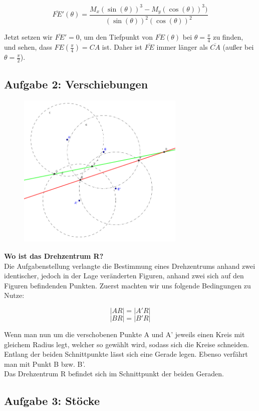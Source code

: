 \documentclass[a4paper,11pt]{article}
\begin{document}
\[ \overline{FE}'(\theta) = \frac{M_x (\sin(\theta))^3 - M_y (\cos(\theta))^3)}{(\sin(\theta))^2 (\cos(\theta))^2} \]

Jetzt setzen wir $\overline{FE}' = 0$, um den Tiefpunkt von $\overline{FE}(\theta)$ bei $\theta = \frac{\pi}{4}$ zu finden, und sehen, dass $FE(\frac{\pi}{4}) = CA$ ist. Daher ist $\overline{FE}$ immer länger als $\overline{CA}$ (au\ss er bei $\theta=\frac{\pi}{2}$).

\subsection{Aufgabe 2: Verschiebungen}

\begin{figure}[htbp] 
        \centering
        \includegraphics[width=8cm]{img/A2_1.png}
\end{figure}

\textbf{Wo ist das Drehzentrum R?} \\
Die Aufgabenstellung verlangte die Bestimmung eines Drehzentrums anhand zwei identischer, jedoch in der Lage 
veränderten Figuren, anhand zwei sich auf den Figuren befindenden Punkten. Zuerst machten wir uns folgende Bedingungen zu Nutze:

\[ |AR| = |A'R| \]
\[ |BR| = |B'R| \]

Wenn man nun um die verschobenen Punkte A und A' jeweils einen Kreis mit gleichem Radius legt, welcher so gewählt wird, sodass sich die Kreise schneiden.\\
Entlang der beiden Schnittpunkte lässt sich eine Gerade legen. Ebenso verfährt man mit Punkt B bzw. B'. \\
Das Drehzentrum R befindet sich im Schnittpunkt der beiden Geraden.

\subsection{Aufgabe 3: St\"ocke}
\end{document}
